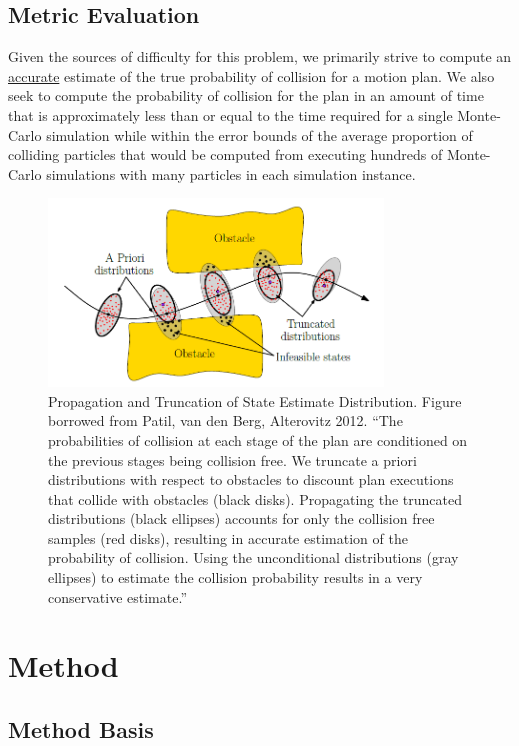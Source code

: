 \documentclass[journal]{IEEEtran}
\begin{document}

\subsection{Metric Evaluation}
Given the sources of difficulty for this problem, we primarily strive to compute an \underline{accurate} estimate of the true probability of collision for a motion plan. We also seek to compute the probability of collision for the plan in an amount of time that is approximately less than or equal to the time required for a single Monte-Carlo simulation while within the error bounds of the average proportion of colliding particles that would be computed from executing hundreds of Monte-Carlo simulations with many particles in each simulation instance.

\begin{figure}[!t]
\centering
\includegraphics[width=3.5in]{motion_pic.PNG}
\caption{Propagation and Truncation of State Estimate Distribution. Figure borrowed from Patil, van den Berg, Alterovitz 2012. ``The probabilities of collision at each stage of the plan are conditioned on the previous stages being collision free. We truncate a priori distributions with respect to obstacles to discount plan executions that collide with obstacles (black disks). Propagating the truncated distributions (black ellipses) accounts for only the collision free samples (red disks), resulting in accurate estimation of the probability of collision. Using the unconditional distributions (gray ellipses) to estimate the collision probability results in a very conservative estimate.''\cite{IEEEhowto:patil}}
\label{patil_figure}
\end{figure}

\section{Method}
\subsection{Method Basis}
\end{document}
